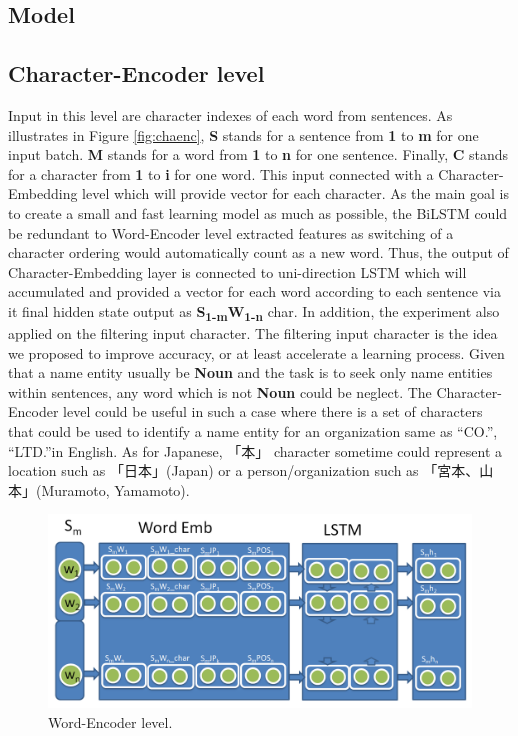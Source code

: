 \begin{CJK*}{UTF8}{min}
\section{Model}
\subsection{Character-Encoder level}
Input in this level are character indexes of each word from sentences.
As illustrates in Figure \ref{fig:chaenc}, \textbf{S} stands for a sentence from \textbf{1} to \textbf{m} for one input batch.
\textbf{M} stands for a word from \textbf{1} to \textbf{n} for one sentence.
Finally, \textbf{C} stands for a character from \textbf{1} to \textbf{i} for one word.
This input connected with a Character-Embedding level which will provide vector for each character.
As the main goal is to create a small and fast learning model as much as possible, the BiLSTM could be redundant to Word-Encoder level extracted features as switching of a character ordering would automatically count as a new word.
Thus, the output of Character-Embedding layer is connected to uni-direction LSTM which will accumulated and provided a vector for each word according to each sentence via it final hidden state output as \textbf{S\textsubscript{1-m}W\textsubscript{1-n}} char.
In addition, the experiment also applied on the filtering input character.
The filtering input character is the idea we proposed to improve accuracy, or at least accelerate a learning process.
Given that a name entity usually be \textbf{Noun} and the task is to seek only name entities within sentences, any word which is not \textbf{Noun} could be neglect.
The Character-Encoder level could be useful in such a case where there is a set of characters that could be used to identify a name entity for an organization same as ``CO.'', ``LTD.''in English.
As for Japanese, 「本」 character sometime could represent a location such as 「日本」(Japan) or a person/organization such as 「宮本、山本」(Muramoto, Yamamoto).


\begin{figure}[!h]
  \includegraphics[scale=0.3]{word_encoder.png}
  \caption{Word-Encoder level.}
  \label{fig:winenc}
\end{figure}



\end{CJK*}
